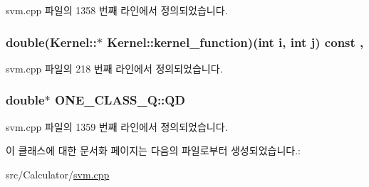 svm.\+cpp 파일의 1358 번째 라인에서 정의되었습니다.

\hypertarget{class_kernel_a575eeb588e8a5c62ff3228a35e255a02}{
\subsubsection[{kernel\+\_\+function}]{\setlength{\rightskip}{0pt plus 5cm}double(Kernel\+::$\ast$ Kernel\+::kernel\+\_\+function)(int i, int j) const \hspace{0.3cm}{\ttfamily [protected]}, {\ttfamily [inherited]}}}\label{class_kernel_a575eeb588e8a5c62ff3228a35e255a02}


svm.\+cpp 파일의 218 번째 라인에서 정의되었습니다.

\hypertarget{class_o_n_e___c_l_a_s_s___q_a12994904e59c98ac7f7ec964ea23b7b4}{
\subsubsection[{Q\+D}]{\setlength{\rightskip}{0pt plus 5cm}double$\ast$ O\+N\+E\+\_\+\+C\+L\+A\+S\+S\+\_\+\+Q\+::\+Q\+D\hspace{0.3cm}{\ttfamily [private]}}}\label{class_o_n_e___c_l_a_s_s___q_a12994904e59c98ac7f7ec964ea23b7b4}


svm.\+cpp 파일의 1359 번째 라인에서 정의되었습니다.



이 클래스에 대한 문서화 페이지는 다음의 파일로부터 생성되었습니다.\+:\begin{DoxyCompactItemize}
\item 
src/\+Calculator/\hyperlink{svm_8cpp}{svm.\+cpp}\end{DoxyCompactItemize}
